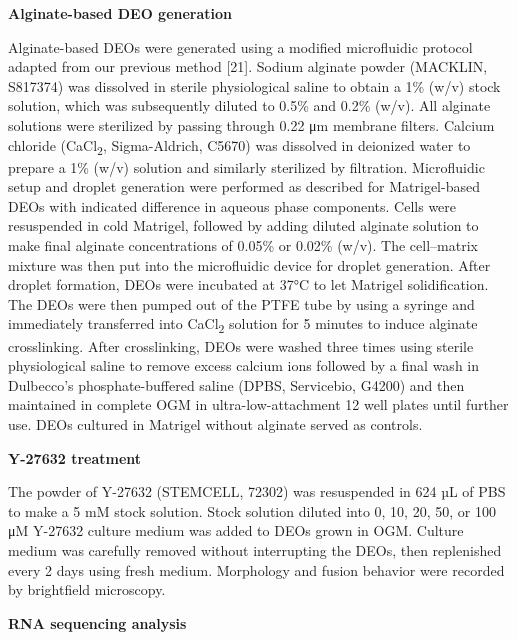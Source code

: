 \documentclass[
]{article}
\begin{document}
\textbf{Alginate-based DEO generation}

Alginate-based DEOs were generated using a modified microfluidic protocol adapted from our previous method {[}21{]}. Sodium alginate powder (MACKLIN, S817374) was dissolved in sterile physiological saline to obtain a 1\% (w/v) stock solution, which was subsequently diluted to 0.5\% and 0.2\% (w/v). All alginate solutions were sterilized by passing through 0.22 μm membrane filters. Calcium chloride (CaCl\textsubscript{2}, Sigma-Aldrich, C5670) was dissolved in deionized water to prepare a 1\% (w/v) solution and similarly sterilized by filtration. Microfluidic setup and droplet generation were performed as described for Matrigel-based DEOs with indicated difference in aqueous phase components. Cells were resuspended in cold Matrigel, followed by adding diluted alginate solution to make final alginate concentrations of 0.05\% or 0.02\% (w/v). The cell--matrix mixture was then put into the microfluidic device for droplet generation. After droplet formation, DEOs were incubated at 37°C to let Matrigel solidification. The DEOs were then pumped out of the PTFE tube by using a syringe and immediately transferred into CaCl\textsubscript{2} solution for 5 minutes to induce alginate crosslinking. After crosslinking, DEOs were washed three times using sterile physiological saline to remove excess calcium ions followed by a final wash in Dulbecco's phosphate-buffered saline (DPBS, Servicebio, G4200) and then maintained in complete OGM in ultra-low-attachment 12 well plates until further use. DEOs cultured in Matrigel without alginate served as controls.

\textbf{Y-27632 treatment}

The powder of Y-27632 (STEMCELL, 72302) was resuspended in 624 µL of PBS to make a 5 mM stock solution. Stock solution diluted into 0, 10, 20, 50, or 100 μM Y-27632 culture medium was added to DEOs grown in OGM. Culture medium was carefully removed without interrupting the DEOs, then replenished every 2 days using fresh medium. Morphology and fusion behavior were recorded by brightfield microscopy.

\textbf{RNA sequencing analysis}
\end{document}
